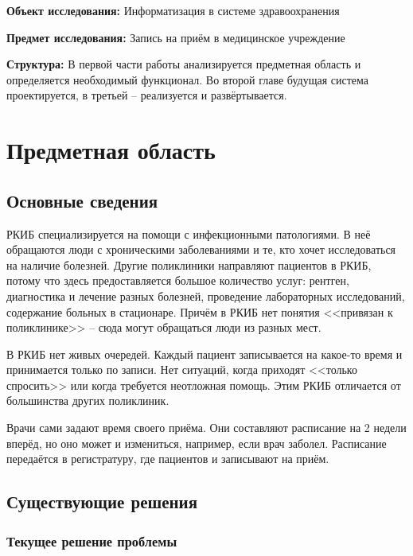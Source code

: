 \documentclass[a4paper,article]{article}
\begin{document}
\begin{sloppypar}
        \textbf{Объект исследования:} Информатизация в системе здравоохранения

        \textbf{Предмет исследования:} Запись на приём в медицинское учреждение

        \textbf{Структура:} В первой части работы анализируется предметная область и определяется необходимый функционал. Во второй главе будущая система проектируется, в третьей -- реализуется и развёртывается.

        \newpage

    \section{Предметная область}

    \subsection{Основные сведения}

        РКИБ специализируется на помощи с инфекционными патологиями. В неё обращаются люди с хроническими заболеваниями и те, кто хочет исследоваться на наличие болезней. Другие поликлиники направляют пациентов в РКИБ, потому что здесь предоставляется большое количество услуг: рентген, диагностика и лечение разных болезней, проведение лабораторных исследований, содержание больных в стационаре. Причём в РКИБ нет понятия <<привязан к поликлинике>> -- сюда могут обращаться люди из разных мест.

        В РКИБ нет живых очередей. Каждый пациент записывается на какое-то время и принимается только по записи. Нет ситуаций, когда приходят <<только спросить>> или когда требуется неотложная помощь. Этим РКИБ отличается от большинства других поликлиник.

        Врачи сами задают время своего приёма. Они составляют расписание на 2 недели вперёд, но оно может и измениться, например, если врач заболел. Расписание передаётся в регистратуру, где пациентов и записывают на приём.

    \subsection{Существующие решения}

    \subsubsection{Текущее решение проблемы}\label{Текущее решение проблемы}


\end{sloppypar}
\end{document}
